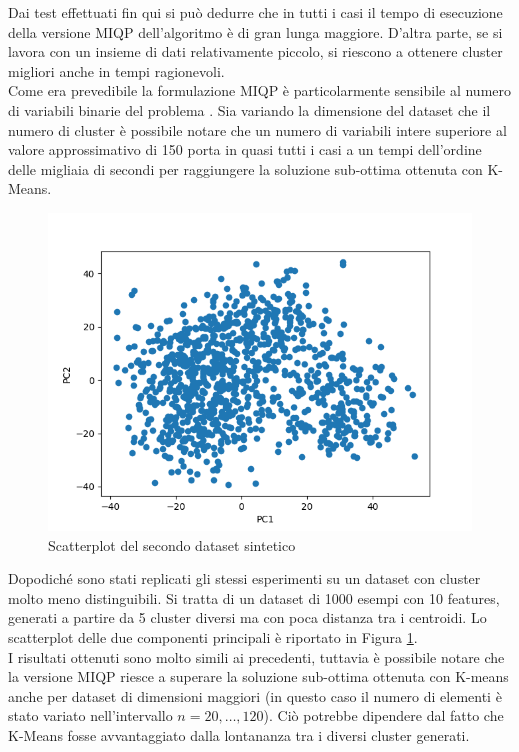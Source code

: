 \documentclass{article}
\begin{document}
    Dai test effettuati fin qui si può dedurre che in tutti i casi il tempo di esecuzione della versione MIQP dell'algoritmo è di gran lunga maggiore. D'altra parte, se si lavora con un insieme di dati relativamente piccolo, si riescono a ottenere cluster migliori anche in tempi ragionevoli.\\
    Come era prevedibile la formulazione MIQP è particolarmente sensibile al numero di variabili binarie del problema \cite{lapucci}. Sia variando la dimensione del dataset che il numero di cluster è possibile notare che un numero di variabili intere superiore al valore approssimativo di 150 porta in quasi tutti i casi a un tempi dell'ordine delle migliaia di secondi per raggiungere la soluzione sub-ottima ottenuta con K-Means.\\

    \begin{figure}
    \includegraphics[width=1\linewidth]{../results/plots/dataset2}
    \caption{Scatterplot del secondo dataset sintetico}
    \label{sint_sint}
    \end{figure}
    Dopodiché sono stati replicati gli stessi esperimenti su un dataset con cluster molto meno distinguibili. Si tratta di un dataset di 1000 esempi con 10 features, generati a partire da 5 cluster diversi ma con poca distanza tra i centroidi. Lo scatterplot delle due componenti principali è riportato in Figura \ref{sint_sint}.\\
    I risultati ottenuti sono molto simili ai precedenti, tuttavia è possibile notare che la versione MIQP riesce a superare la soluzione sub-ottima ottenuta con K-means anche per dataset di dimensioni maggiori (in questo caso il numero di elementi è stato variato nell'intervallo $n=20,\dots,120$). Ciò potrebbe dipendere dal fatto che K-Means fosse avvantaggiato dalla lontananza tra i diversi cluster generati.\\
\end{document}
